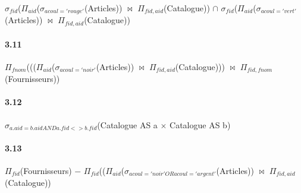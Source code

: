 \documentclass[a4paper,10pt]{article}
\begin{document}
$\sigma_{fid}$($\Pi_{aid}$($\sigma_{acoul='rouge'}$(Articles)) 
$\bowtie$
$\Pi_{fid,aid}$(Catalogue))
$\cap$
$\sigma_{fid}$($\Pi_{aid}$($\sigma_{acoul='vert'}$(Articles)) 
$\bowtie$
$\Pi_{fid,aid}$(Catalogue))

\paragraph{3.11}

$\Pi_{fnom}$((($\Pi_{aid}$($\sigma_{acoul='noir'}$(Articles))
$\bowtie$
$\Pi_{fid,aid}$(Catalogue)))
$\bowtie$
$\Pi_{fid, fnom}$(Fournisseurs))


\paragraph{3.12}

$\sigma_{a.aid=b.aid AND a.fid <> b.fid }$(Catalogue AS a $\times$ Catalogue AS b)


\paragraph{3.13}

$\Pi_{fid}$(Fournisseurs)
$-$
$\Pi_{fid}$(($\Pi_{aid}$($\sigma_{acoul='noir' OR acoul='argent'}$(Articles))
$\bowtie$
$\Pi_{fid, aid}$(Catalogue))

\Mundo
\end{document}

